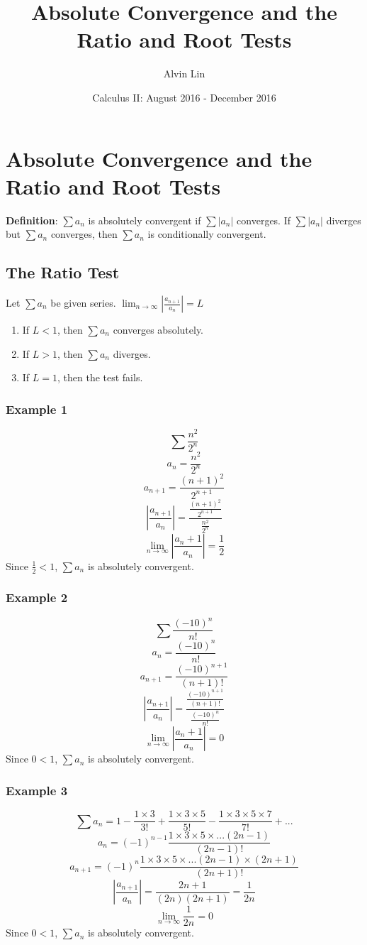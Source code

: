 \documentclass[letterpaper, 12pt]{article}
\title{Absolute Convergence and the Ratio and Root Tests}
\author{Alvin Lin}
\date{Calculus II: August 2016 - December 2016}
\begin{document}
\maketitle

\section*{Absolute Convergence and the Ratio and Root Tests}
\textbf{Definition}: \( \sum{a_{n}} \) is absolutely convergent if
\( \sum|a_{n}| \) converges. If \( \sum|a_{n}| \) diverges but
\( \sum{a_{n}} \) converges, then \( \sum{a_{n}} \) is conditionally convergent.

\subsection*{The Ratio Test}
Let \( \sum{a_{n}} \) be given series.
\( \lim_{n\to\infty}|\frac{a_{n+1}}{a_{n}}| = L \)
\begin{enumerate}
  \item If \( L < 1 \), then \( \sum{a_{n}} \) converges absolutely.
  \item If \( L > 1 \), then \( \sum{a_{n}} \) diverges.
  \item If \( L = 1 \), then the test fails.
\end{enumerate}

\subsubsection*{Example 1}
\[ \sum\frac{n^{2}}{2^{n}} \]
\[ a_{n} = \frac{n^{2}}{2^{n}} \]
\[ a_{n+1} = \frac{(n+1)^{2}}{2^{n+1}} \]
\[ |\frac{a_{n+1}}{a_{n}}| =
   \frac{\frac{(n+1)^{2}}{2^{n+1}}}{\frac{n^{2}}{2^{n}}} \]
\[ \lim_{n\to\infty}|\frac{a_{n}+1}{a_{n}}| = \frac{1}{2} \]
Since \( \frac{1}{2} < 1 \), \( \sum{a_{n}} \) is absolutely convergent.

\subsubsection*{Example 2}
\[ \sum\frac{(-10)^{n}}{n!} \]
\[ a_{n} = \frac{(-10)^{n}}{n!} \]
\[ a_{n+1} = \frac{(-10)^{n+1}}{(n+1)!} \]
\[ |\frac{a_{n+1}}{a_{n}}| =
   \frac{\frac{(-10)^{n+1}}{(n+1)!}}{\frac{(-10)^{n}}{n!}} \]
\[ \lim_{n\to\infty}|\frac{a_{n}+1}{a_{n}}| = 0 \]
Since \( 0 < 1 \), \( \sum{a_{n}} \) is absolutely convergent.

\subsubsection*{Example 3}
\[ \sum{a_{n}} = 1-\frac{1\times 3}{3!}+\frac{1\times 3\times 5}{5!}-
   \frac{1\times 3\times 5\times 7}{7!}+... \]
\[ a_{n} = (-1)^{n-1}\frac{1\times 3\times 5\times...(2n-1)}{(2n-1)!} \]
\[ a_{n+1} = (-1)^{n}\frac{1\times 3\times 5\times...(2n-1)\times(2n+1)}
   {(2n+1)!} \]
\[ |\frac{a_{n+1}}{a_{n}}| = \frac{2n+1}{(2n)(2n+1)} = \frac{1}{2n} \]
\[ \lim_{n\to\infty}\frac{1}{2n} = 0 \]
Since \( 0 < 1 \), \( \sum{a_{n}} \) is absolutely convergent.
\end{document}
